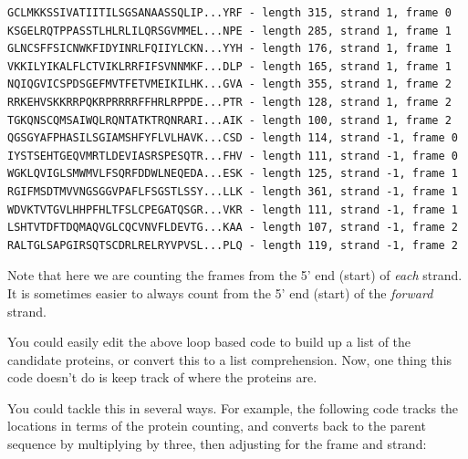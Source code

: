 \documentclass{report}
\begin{document}
\begin{verbatim}
GCLMKKSSIVATIITILSGSANAASSQLIP...YRF - length 315, strand 1, frame 0
KSGELRQTPPASSTLHLRLILQRSGVMMEL...NPE - length 285, strand 1, frame 1
GLNCSFFSICNWKFIDYINRLFQIIYLCKN...YYH - length 176, strand 1, frame 1
VKKILYIKALFLCTVIKLRRFIFSVNNMKF...DLP - length 165, strand 1, frame 1
NQIQGVICSPDSGEFMVTFETVMEIKILHK...GVA - length 355, strand 1, frame 2
RRKEHVSKKRRPQKRPRRRRFFHRLRPPDE...PTR - length 128, strand 1, frame 2
TGKQNSCQMSAIWQLRQNTATKTRQNRARI...AIK - length 100, strand 1, frame 2
QGSGYAFPHASILSGIAMSHFYFLVLHAVK...CSD - length 114, strand -1, frame 0
IYSTSEHTGEQVMRTLDEVIASRSPESQTR...FHV - length 111, strand -1, frame 0
WGKLQVIGLSMWMVLFSQRFDDWLNEQEDA...ESK - length 125, strand -1, frame 1
RGIFMSDTMVVNGSGGVPAFLFSGSTLSSY...LLK - length 361, strand -1, frame 1
WDVKTVTGVLHHPFHLTFSLCPEGATQSGR...VKR - length 111, strand -1, frame 1
LSHTVTDFTDQMAQVGLCQCVNVFLDEVTG...KAA - length 107, strand -1, frame 2
RALTGLSAPGIRSQTSCDRLRELRYVPVSL...PLQ - length 119, strand -1, frame 2
\end{verbatim}

Note that here we are counting the frames from the 5' end (start) of
\emph{each} strand. It is sometimes easier to always count from the 5' end
(start) of the \emph{forward} strand.

You could easily edit the above loop based code to build up a list of the
candidate proteins, or convert this to a list comprehension.  Now, one thing
this code doesn't do is keep track of where the proteins are.

You could tackle this in several ways.  For example, the following code tracks
the locations in terms of the protein counting, and converts back to the
parent sequence by multiplying by three, then adjusting for the frame and
strand:
\end{document}
